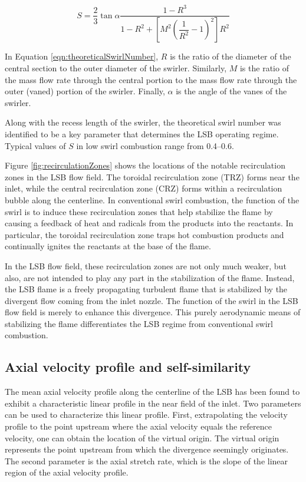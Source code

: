 \begin{equation}
S = \frac{2}{3} \tan \alpha \frac{ 1 - R^3 }{ 1 - R^2 + \left[ M^2\left( \dfrac{1}{R^2} - 1 \right)^2 \right]R^2}
\label{eqn:theoreticalSwirlNumber}
\end{equation}

In Equation \ref{eqn:theoreticalSwirlNumber}, \(R\) is the ratio of the diameter of the central section to the outer diameter of the swirler.
Similarly, \(M\) is the ratio of the mass flow rate through the central portion to the mass flow rate through the outer (vaned) portion of the swirler.
Finally, \(\alpha\) is the angle of the vanes of the swirler.

Along with the recess length of the swirler, the theoretical swirl number was identified to be a key parameter that determines the LSB operating regime.\cite{2002-littlejohn}
Typical values of \(S\) in low swirl combustion range from 0.4--0.6.



Figure \ref{fig:recirculationZones} shows the locations of the notable recirculation zones in the LSB flow field.
The toroidal recirculation zone (TRZ) forms near the inlet, while the central recirculation zone (CRZ) forms within a recirculation bubble along the centerline.
In conventional swirl combustion, the function of the swirl is to induce these recirculation zones that help stabilize the flame by causing a feedback of heat and radicals from the products into the reactants.
In particular, the toroidal recirculation zone traps hot combustion products and continually ignites the reactants at the base of the flame.\cite{2005-johnson}

In the LSB flow field, these recirculation zones are not only much weaker, but also, are not intended to play any part in the stabilization of the flame.
Instead, the LSB flame is a freely propagating turbulent flame that is stabilized by the divergent flow coming from the inlet nozzle.
The function of the swirl in the LSB flow field is merely to enhance this divergence.
This purely aerodynamic means of stabilizing the flame differentiates the LSB regime from conventional swirl combustion.

\subsection{Axial velocity profile and self-similarity}
\label{subsec:lsb-axial-velocity-profile}

The mean axial velocity profile along the centerline of the LSB has been found\cite{2006-cheng,2008-cheng-a} to exhibit a characteristic linear profile in the near field of the inlet.
Two parameters can be used to characterize this linear profile.
First, extrapolating the velocity profile to the point upstream where the axial velocity equals the reference velocity, one can obtain the location of the virtual origin.
The virtual origin represents the point upstream from which the divergence seemingly originates.
The second parameter is the axial stretch rate, which is the slope of the linear region of the axial velocity profile.

